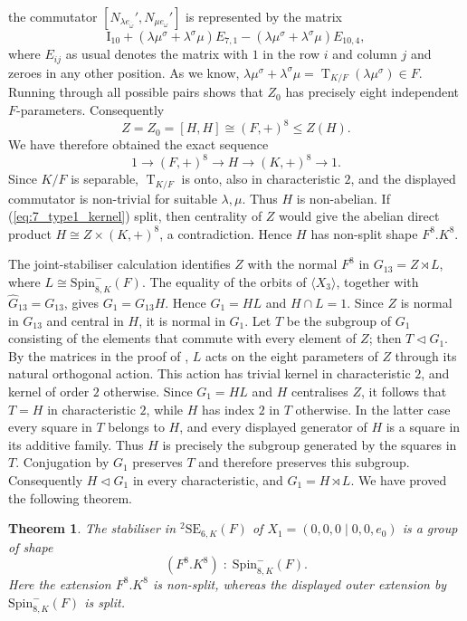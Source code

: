 \documentclass{amsart}
\def\cn{\mathord{{\;\!{:}\;\!}}}
\def\II{\mathord{\mathrm{I}}}
\newcommand{\SE}{\mathrm{SE}}
\newcommand{\Spin}{\mathrm{Spin}}
\newcommand{\Tr}{\operatorname{T}}
\renewcommand{\bar}{\overline}
\renewcommand{\hat}{\widehat}
\newcommand{\s}{\sigma}
\theoremstyle{plain}
\newtheorem{theorem}{Theorem}
\numberwithin{theorem}{section}
\theoremstyle{definition}
\begin{document}
the commutator $[N_{\lambda e_{\bar{\omega}}}', 
N_{\mu e_{\omega}}']$ is represented by the matrix 
\begin{equation}
\II_{10} + (\lambda \mu^{\s} + \lambda^{\s}\mu)E_{7,1} 
- (\lambda \mu^{\s} + \lambda^{\s}\mu) E_{10,4},
\end{equation}
where 
$E_{i j}$ as usual denotes the matrix with $1$ in the row $i$
and column $j$ and zeroes in any other position. As we know,
$\lambda \mu^{\s} + \lambda^{\s}\mu
=\Tr_{K/F}(\lambda\mu^{\s})\in F$.  Running through all possible pairs
shows that $Z_0$ has precisely eight independent $F$-parameters.  Consequently
\begin{equation*}
	 Z=Z_0=[H,H]\cong(F,+)^8\leqslant Z(H).
\end{equation*}
We have therefore obtained the exact sequence
\begin{equation}
	 \label{eq:7_type1_kernel}
	 1\longrightarrow(F,+)^8\longrightarrow H\longrightarrow(K,+)^8
	 \longrightarrow1.
\end{equation}
Since $K/F$ is separable, $\Tr_{K/F}$ is onto, also in characteristic
$2$, and the displayed commutator is non-trivial for suitable
$\lambda,\mu$.  Thus $H$ is non-abelian.  If
(\ref{eq:7_type1_kernel}) split, then centrality of $Z$ would give the
abelian direct product $H\cong Z\times(K,+)^8$, a contradiction.  Hence
$H$ has non-split shape $F^8.K^8$.

The joint-stabiliser calculation identifies $Z$ with the normal $F^8$
in $G_{13}=Z\rtimes L$, where $L\cong\Spin_{8,K}^{-}(F)$.
The equality of the orbits of $\langle X_3\rangle$, together with
$\hat G_{13}=G_{13}$, gives $G_1=G_{13}H$.  Hence $G_1=HL$ and
$H\cap L=1$.  Since $Z$ is normal in $G_{13}$ and central in $H$,
it is normal in $G_1$.  Let $T$ be the subgroup of $G_1$ consisting
of the elements that commute with every element of $Z$; then
$T\lhd G_1$.  By the matrices in the proof of
\cite[Lemma~2.1]{BSW1}, $L$ acts on the eight parameters of $Z$
through its natural orthogonal action.  This action has trivial kernel
in characteristic $2$, and kernel of order $2$ otherwise.  Since
$G_1=HL$ and $H$ centralises $Z$, it follows that $T=H$ in
characteristic $2$, while $H$ has index $2$ in $T$ otherwise.  In the
latter case every square in $T$ belongs to $H$, and every displayed
generator of $H$ is a square in its additive family.  Thus $H$ is
precisely the subgroup generated by the squares in $T$.  Conjugation
by $G_1$ preserves $T$ and therefore preserves this subgroup.
Consequently $H\lhd G_1$ in every characteristic, and
$G_1=H\rtimes L$.
We have proved the following theorem.
\begin{theorem}
	\label{theorem:7_type1_stabiliser}
	The stabiliser in ${}^2\SE_{6,K}(F)$ of 
	$X_1 = (0,0,0\mid 0,0,e_0)$ 
	is a group of shape
	\begin{equation}
		(F^{8}.K^{8})\cn\Spin_{8,K}^{-}(F).
	\end{equation}
	Here the extension $F^8.K^8$ is non-split, whereas the displayed
	outer extension by $\Spin_{8,K}^{-}(F)$ is split.
\end{theorem}
\end{document}
